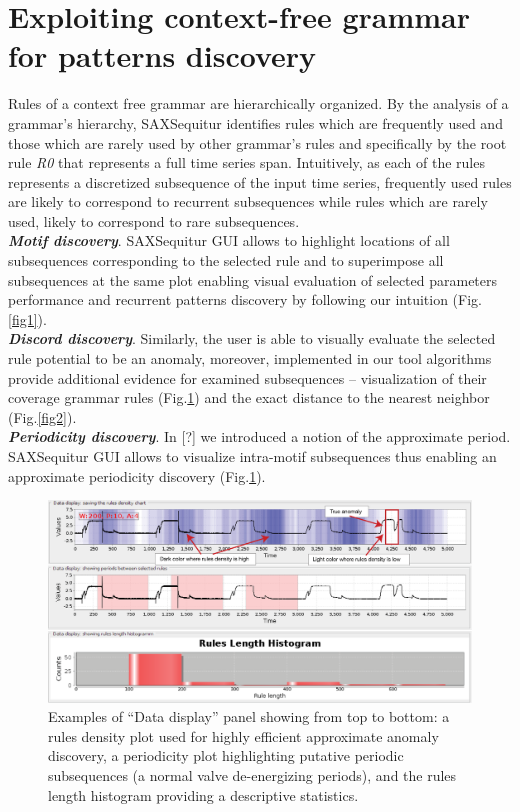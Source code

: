 \documentclass{llncs}
\begin{document}
\section{Exploiting context-free grammar for patterns discovery}
Rules of a context free grammar are hierarchically organized. By the analysis of a grammar's hierarchy, SAXSequitur identifies rules which are frequently used and those which are rarely used by other grammar's rules and specifically by the root rule \textit{R0} that represents a full time series span. Intuitively, as each of the rules represents a discretized subsequence of the input time series, frequently used rules are likely to correspond to recurrent subsequences while rules which are rarely used, likely to correspond to rare subsequences.\\
\textit{\textbf{Motif discovery}}. SAXSequitur GUI allows to highlight locations of all subsequences corresponding to the selected rule and to superimpose all subsequences at the same plot enabling visual evaluation of selected parameters performance and recurrent patterns discovery by following our intuition (Fig.\ref{fig1}).\\
{\parindent0pt
\textit{\textbf{Discord discovery}}. Similarly, the user is able to visually evaluate the selected rule potential to be an anomaly, moreover, implemented in our tool algorithms provide additional evidence for examined subsequences -- visualization of their coverage grammar rules (Fig.\ref{fig3}) and the exact distance to the nearest neighbor (Fig.\ref{fig2}).
}\\
{\parindent0pt
\textit{\textbf{Periodicity discovery}}.
In [?] we introduced a notion of the approximate period. \\ SAXSequitur GUI allows to visualize intra-motif subsequences thus enabling an approximate periodicity discovery (Fig.\ref{fig3}).}

\begin{figure}[t]
   \vspace{-0.8cm}
   \centering
   \includegraphics[width=120mm]{TEK16_DataDisplayScreens.eps}
   \caption{Examples of ``Data display'' panel showing from top to bottom: a rules density plot used for highly efficient approximate anomaly discovery, a periodicity plot highlighting putative periodic subsequences (a normal valve de-energizing periods), and the rules length histogram providing a descriptive statistics.}
   \label{fig3}
   \vspace{-0.4cm}
\end{figure}
\enlargethispage{1.5cm}
\end{document}
